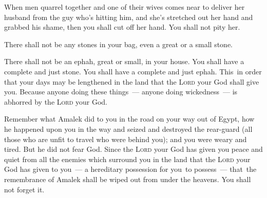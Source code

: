 \begin{inparaenum}
   When men quarrel together and one of their wives comes near to deliver her husband from the guy who's hitting him, and she's stretched out her hand and grabbed his shame,%
   then you shall cut off her hand. You shall not pity her.%
  
   There shall not be any stones in your bag, even a great or a small stone.%
  
   There shall not be an ephah, great or small, in your house.%
   You shall have a complete and just stone. You shall have a complete and just ephah. This\understood\ in order that your days may be lengthened in the land that the \textsc{Lord} your God shall give you.%
   Because anyone doing these things~--- anyone doing wickedness~--- is abhorred by the \textsc{Lord} your God.%
  
   Remember what Amalek did to you in the road on your way out of Egypt,%
   how he happened upon you in the way and seized and destroyed the rear-guard (all those who are unfit to travel who were behind you); and you were weary and tired. But he did not fear God.%
   Since the \textsc{Lord} your God has given you peace and quiet from all the enemies which surround you in the land that the \textsc{Lord} your God has given to you~--- a hereditary possession for you\understood\ to possess~--- that\understood\ the remembrance of Amalek shall be wiped out from under the heavens. You shall not forget it.%
\end{inparaenum}
